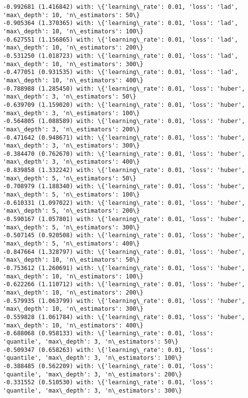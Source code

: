 \documentclass[11pt]{article}
\begin{document}
\begin{Verbatim}[commandchars=\\\{\}]
-0.992681 (1.416842) with: \{'learning\_rate': 0.01, 'loss': 'lad', 'max\_depth': 10, 'n\_estimators': 50\}
-0.905364 (1.370365) with: \{'learning\_rate': 0.01, 'loss': 'lad', 'max\_depth': 10, 'n\_estimators': 100\}
-0.627551 (1.156865) with: \{'learning\_rate': 0.01, 'loss': 'lad', 'max\_depth': 10, 'n\_estimators': 200\}
-0.531250 (1.018723) with: \{'learning\_rate': 0.01, 'loss': 'lad', 'max\_depth': 10, 'n\_estimators': 300\}
-0.477051 (0.931535) with: \{'learning\_rate': 0.01, 'loss': 'lad', 'max\_depth': 10, 'n\_estimators': 400\}
-0.788988 (1.285450) with: \{'learning\_rate': 0.01, 'loss': 'huber', 'max\_depth': 3, 'n\_estimators': 50\}
-0.639709 (1.159020) with: \{'learning\_rate': 0.01, 'loss': 'huber', 'max\_depth': 3, 'n\_estimators': 100\}
-0.564805 (1.088589) with: \{'learning\_rate': 0.01, 'loss': 'huber', 'max\_depth': 3, 'n\_estimators': 200\}
-0.471642 (0.948671) with: \{'learning\_rate': 0.01, 'loss': 'huber', 'max\_depth': 3, 'n\_estimators': 300\}
-0.384470 (0.762670) with: \{'learning\_rate': 0.01, 'loss': 'huber', 'max\_depth': 3, 'n\_estimators': 400\}
-0.839858 (1.332242) with: \{'learning\_rate': 0.01, 'loss': 'huber', 'max\_depth': 5, 'n\_estimators': 50\}
-0.708979 (1.188340) with: \{'learning\_rate': 0.01, 'loss': 'huber', 'max\_depth': 5, 'n\_estimators': 100\}
-0.610331 (1.097022) with: \{'learning\_rate': 0.01, 'loss': 'huber', 'max\_depth': 5, 'n\_estimators': 200\}
-0.590167 (1.057801) with: \{'learning\_rate': 0.01, 'loss': 'huber', 'max\_depth': 5, 'n\_estimators': 300\}
-0.507145 (0.920508) with: \{'learning\_rate': 0.01, 'loss': 'huber', 'max\_depth': 5, 'n\_estimators': 400\}
-0.847664 (1.328797) with: \{'learning\_rate': 0.01, 'loss': 'huber', 'max\_depth': 10, 'n\_estimators': 50\}
-0.753612 (1.260691) with: \{'learning\_rate': 0.01, 'loss': 'huber', 'max\_depth': 10, 'n\_estimators': 100\}
-0.622266 (1.110712) with: \{'learning\_rate': 0.01, 'loss': 'huber', 'max\_depth': 10, 'n\_estimators': 200\}
-0.579935 (1.063799) with: \{'learning\_rate': 0.01, 'loss': 'huber', 'max\_depth': 10, 'n\_estimators': 300\}
-0.559828 (1.061784) with: \{'learning\_rate': 0.01, 'loss': 'huber', 'max\_depth': 10, 'n\_estimators': 400\}
-0.688068 (0.958133) with: \{'learning\_rate': 0.01, 'loss': 'quantile', 'max\_depth': 3, 'n\_estimators': 50\}
-0.509347 (0.658263) with: \{'learning\_rate': 0.01, 'loss': 'quantile', 'max\_depth': 3, 'n\_estimators': 100\}
-0.388485 (0.562209) with: \{'learning\_rate': 0.01, 'loss': 'quantile', 'max\_depth': 3, 'n\_estimators': 200\}
-0.331552 (0.510530) with: \{'learning\_rate': 0.01, 'loss': 'quantile', 'max\_depth': 3, 'n\_estimators': 300\}

\end{Verbatim}
\end{document}
